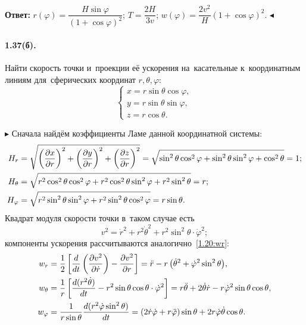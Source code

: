 \documentclass{weekly}
\begin{document}
\textbf{Ответ:}\quad
$r(\varphi) =
    \dfrac{H \sin\varphi}{\left( 1 + \cos\varphi \right)^2}$;\qquad
$T = \dfrac{2H}{3v}$;\qquad
$w(\varphi) = \dfrac{2v^2}{H} \left(1 + \cos\varphi\right)^2$.
\hfill $\blacktriangleleft$


\paragraph{1.37(б).} Найти скорость точки и~проекции её
ускорения на~касательные к~координатным линиям
для~сферических координат $r, \theta, \varphi$:
\begin{equation}
    \begin{cases}
        x = r\sin\theta\cos\varphi, \\
        y = r\sin\theta\sin\varphi, \\
        z = r\cos\theta.
    \end{cases}
\end{equation}

$\blacktriangleright$ Сначала найдём коэффициенты Ламе
данной координатной системы:
\begin{align}
    H_r &= \sqrt{\left(\frac{\partial x}{\partial r}\right)^2 +
            \left(\frac{\partial y}{\partial r}\right)^2 +
            \left(\frac{\partial z}{\partial r}\right)^2}
        = \sqrt{\sin^2\theta \cos^2\varphi +
            \sin^2\theta \sin^2\varphi +
            \cos^2\theta} = 1; \\
    H_\theta &= \sqrt{r^2 \cos^2\theta \cos^2\varphi +
            r^2 \cos^2\theta \sin^2\varphi +
            r^2 \sin^2\theta} = r; \\
    H_\varphi &= \sqrt{r^2 \sin^2\theta \sin^2\varphi +
            r^2 \sin^2\theta \cos^2\varphi} = r \sin\theta.
\end{align}
Квадрат модуля скорости точки в~таком случае есть
\begin{equation}
    v^2 = \dot r^2 + r^2 \dot\theta^2 +
            r^2 \sin^2\theta \cdot \dot\varphi^2;
\end{equation}
компоненты ускорения рассчитываются аналогично~\eqref{1.20:wr}:
\begin{align}
    w_r &= \frac{1}{2} \left[ \frac{d }{d t}
            \left( \frac{\partial v^2}{\partial \dot r} \right) -
            \frac{\partial v^2}{\partial r} \right]
        = \ddot r - r \left( \dot\theta^2 +
            \dot\varphi^2 \sin^2\theta \right)\!, \\
    w_\theta &= \frac{1}{r} \left[ \frac{d (r^2 \dot\theta)}{d t} -
            r^2 \sin\theta \cos\theta \cdot \dot\varphi^2 \right]
        = r \ddot\theta + 2\dot\theta \dot r -
            r \dot\varphi^2 \sin\theta \cos\theta, \\
    w_\varphi &= \frac{1}{r\sin\theta}
            \frac{d (r^2 \dot\varphi \sin^2\theta)}{d t}
        = (2 \dot r \dot\varphi + r \ddot\varphi) \sin\theta +
            2r \dot\varphi \dot\theta \cos\theta.
\end{align}
\end{document}
